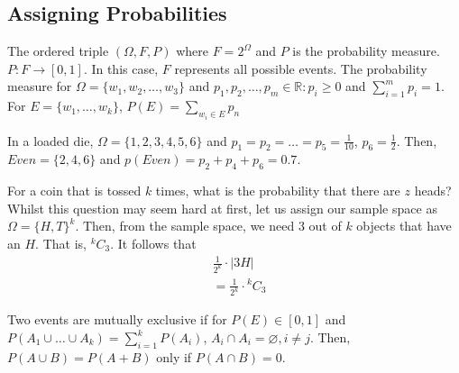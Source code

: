 \documentclass[a4paper]{article}
\theoremstyle{plain}
\theoremstyle{definition}
\newtheorem{defn}{Definition}[section]
\newtheorem{exmp}{Example}[section]
\theoremstyle{remark}
\begin{document}
\subsection{Assigning Probabilities}
\begin{tcolorbox}[colback=black!3!white,colframe=black!60!white,title=\begin{defn}Probability Spaces \label{Probability Spaces}\end{defn}]
The ordered triple $(\Omega,F,P)$ where $F = 2^{\Omega}$ and $P$ is the probability measure. $P: F \to [0,1]$. In this case, $F$ represents all possible events. The probability measure for $\Omega = \{ w_1,w_2,\ldots,w_3\}$ and $p_1,p_2,\ldots,p_m \in \mathbb{R} : p_i \ge 0$ and $\sum_{i=1}^{m} p_i=1$. For $E = \{w_1,\ldots,w_k\}$, $P(E) = \sum_{w_i \in E} p_n$
\end{tcolorbox}
\begin{tcolorbox}[colback=black!3!white,colframe=black!60!white,title=\begin{exmp}Example 1 \label{Example 1}\end{exmp}]
In a loaded die, $\Omega = \{1,2,3,4,5,6\}$ and $p_1=p_2=\ldots=p_5=\frac{1}{10}$, $p_6=\frac{1}{2}$. Then, $Even = \{2,4,6\}$ and $p(Even) = p_2+p_4+p_6 = 0.7$.
\end{tcolorbox}
\begin{tcolorbox}[colback=black!3!white,colframe=black!60!white,title=\begin{exmp}Coins \label{Coins}\end{exmp}]
        For a coin that is tossed $k$ times, what is the probability that there are $z$ heads? \\
	Whilst this question may seem hard at first, let us assign our sample space as $\Omega = \{H,T\}^{k}$. Then, from the sample space, we need $3$ out of $k$ objects that have an $H$. That is, $^{k}C_3$. It follows that 
                \begin{align}
			&\frac{1}{2^{k}} \cdot |3H| \\
			&=\frac{1}{2^{k}} \cdot {}^kC_3 
                \end{align}
\end{tcolorbox}
\begin{tcolorbox}[colback=black!3!white,colframe=black!60!white,title=\begin{defn}Mutually Exclusive \label{Mutually Exclusive}\end{defn}]
Two events are mutually exclusive if for $P(E) \in [0,1]$ and $P(A_1 \cup \ldots\cup A_k) = \sum_{i=1}^{k} P(A_i)$, $A_i \cap A_i = \varnothing, i \neq j$. Then, $P(A \cup B) = P(A+B)$ only if $P(A \cap B) = 0$. 
\end{tcolorbox}
\end{document}
